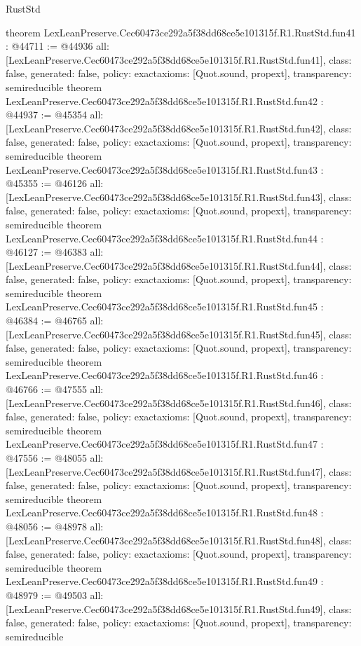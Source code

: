 \begin{lexlean}{RustStd}
\begin{coremodule}
{}
theorem LexLeanPreserve.Cec60473ce292a5f38dd68ce5e101315f.R1.RustStd.fun41 : @44711 := @44936 {
  all: [LexLeanPreserve.Cec60473ce292a5f38dd68ce5e101315f.R1.RustStd.fun41],
  class: false,
  generated: false,
  policy: exact{axioms: [Quot.sound, propext]},
  transparency: semireducible
}
theorem LexLeanPreserve.Cec60473ce292a5f38dd68ce5e101315f.R1.RustStd.fun42 : @44937 := @45354 {
  all: [LexLeanPreserve.Cec60473ce292a5f38dd68ce5e101315f.R1.RustStd.fun42],
  class: false,
  generated: false,
  policy: exact{axioms: [Quot.sound, propext]},
  transparency: semireducible
}
theorem LexLeanPreserve.Cec60473ce292a5f38dd68ce5e101315f.R1.RustStd.fun43 : @45355 := @46126 {
  all: [LexLeanPreserve.Cec60473ce292a5f38dd68ce5e101315f.R1.RustStd.fun43],
  class: false,
  generated: false,
  policy: exact{axioms: [Quot.sound, propext]},
  transparency: semireducible
}
theorem LexLeanPreserve.Cec60473ce292a5f38dd68ce5e101315f.R1.RustStd.fun44 : @46127 := @46383 {
  all: [LexLeanPreserve.Cec60473ce292a5f38dd68ce5e101315f.R1.RustStd.fun44],
  class: false,
  generated: false,
  policy: exact{axioms: [Quot.sound, propext]},
  transparency: semireducible
}
theorem LexLeanPreserve.Cec60473ce292a5f38dd68ce5e101315f.R1.RustStd.fun45 : @46384 := @46765 {
  all: [LexLeanPreserve.Cec60473ce292a5f38dd68ce5e101315f.R1.RustStd.fun45],
  class: false,
  generated: false,
  policy: exact{axioms: [Quot.sound, propext]},
  transparency: semireducible
}
theorem LexLeanPreserve.Cec60473ce292a5f38dd68ce5e101315f.R1.RustStd.fun46 : @46766 := @47555 {
  all: [LexLeanPreserve.Cec60473ce292a5f38dd68ce5e101315f.R1.RustStd.fun46],
  class: false,
  generated: false,
  policy: exact{axioms: [Quot.sound, propext]},
  transparency: semireducible
}
theorem LexLeanPreserve.Cec60473ce292a5f38dd68ce5e101315f.R1.RustStd.fun47 : @47556 := @48055 {
  all: [LexLeanPreserve.Cec60473ce292a5f38dd68ce5e101315f.R1.RustStd.fun47],
  class: false,
  generated: false,
  policy: exact{axioms: [Quot.sound, propext]},
  transparency: semireducible
}
theorem LexLeanPreserve.Cec60473ce292a5f38dd68ce5e101315f.R1.RustStd.fun48 : @48056 := @48978 {
  all: [LexLeanPreserve.Cec60473ce292a5f38dd68ce5e101315f.R1.RustStd.fun48],
  class: false,
  generated: false,
  policy: exact{axioms: [Quot.sound, propext]},
  transparency: semireducible
}
theorem LexLeanPreserve.Cec60473ce292a5f38dd68ce5e101315f.R1.RustStd.fun49 : @48979 := @49503 {
  all: [LexLeanPreserve.Cec60473ce292a5f38dd68ce5e101315f.R1.RustStd.fun49],
  class: false,
  generated: false,
  policy: exact{axioms: [Quot.sound, propext]},
  transparency: semireducible
}
\end{coremodule}
\end{lexlean}

